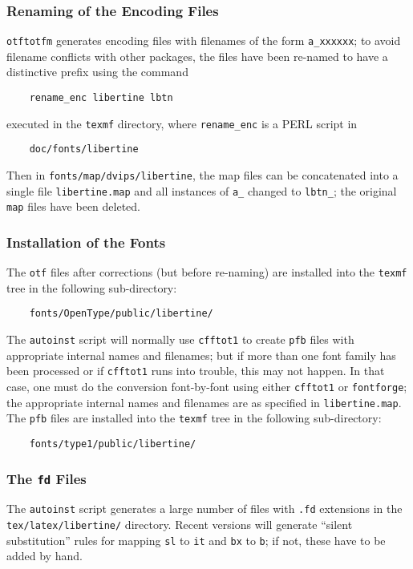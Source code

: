 \documentclass[11pt]{article}
\begin{document}
\subsubsection{Renaming of the Encoding Files}
\texttt{otftotfm} generates encoding files with filenames of the form \verb|a_xxxxxx|;
to avoid filename conflicts with other packages, the files have been re-named
to have a distinctive prefix using the
command
\begin{verbatim}
    rename_enc libertine lbtn
\end{verbatim}
executed in the \texttt{texmf} directory, where
\verb|rename_enc| is a PERL script in 
\begin{verbatim}
    doc/fonts/libertine
\end{verbatim}
Then in \verb|fonts/map/dvips/libertine|, 
the map files can be concatenated into a single file \verb|libertine.map| and
all instances of \verb|a_| changed to \verb|lbtn_|; the 
original \verb|map| files have been deleted.

\subsubsection{Installation of the Fonts}

The \texttt{otf} files after corrections (but before re-naming) are
installed into the \texttt{texmf} tree in the following sub-directory:
\begin{verbatim}
    fonts/OpenType/public/libertine/
\end{verbatim}
The \texttt{autoinst} script will normally use \texttt{cfftot1}
to create \verb|pfb| files with appropriate internal names
and filenames; but if more than one font family has been processed
or if \texttt{cfftot1} runs into trouble, this may not happen.  In that
case, one must do the conversion font-by-font using either \texttt{cfftot1}
or \texttt{fontforge}; the appropriate internal names and filenames are as specified in 
\verb|libertine.map|. 
The \texttt{pfb} files are installed into the \texttt{texmf} tree in the following
sub-directory:
\begin{verbatim}
    fonts/type1/public/libertine/
\end{verbatim}

\subsubsection{The \texttt{fd} Files}
The \texttt{autoinst} script generates a large number of files with
\verb|.fd| extensions in the \verb|tex/latex/libertine/| directory.
Recent versions will generate ``silent substitution''
rules for mapping \texttt{sl} to \texttt{it} and \texttt{bx} to \texttt{b};
if not, these have to be added by hand.
\end{document}
